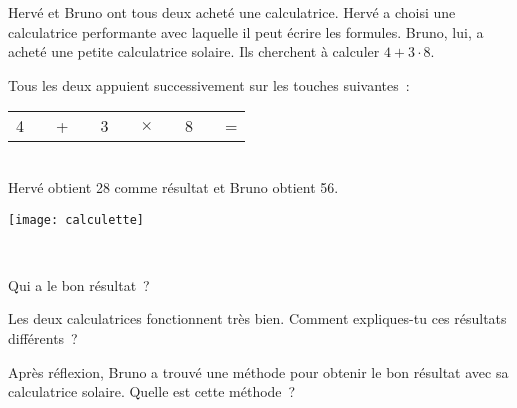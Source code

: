 
\begin{activite}

 \begin{minipage}{0.6\textwidth}
Hervé et Bruno ont tous deux acheté une calculatrice. Hervé a choisi une calculatrice performante avec laquelle il peut écrire les formules. Bruno, lui, a acheté une petite calculatrice solaire. Ils cherchent à calculer $4 + 3 \cdot 8$.

Tous les deux appuient successivement sur les touches suivantes :  \\[0.5em]
\begin{tabular}{|c|c|c|c|c|c|c|c|c|c|c|}
\cline{1-1} \cline{3-3}\cline{5-5} \cline{7-7}\cline{9-9} \cline{11-11}
4 & & + & & 3 & & $\times$ & & 8 & & = \\ \cline{1-1} \cline{3-3}\cline{5-5} \cline{7-7}\cline{9-9} \cline{11-11}
\end{tabular} \\[0.5em]
Hervé obtient 28 comme résultat et Bruno obtient 56.
 \end{minipage} \hfill%
  \begin{minipage}{0.2\textwidth}
   \texttt{[image: calculette]}
   \end{minipage}\\

\begin{partie}
Qui a le bon résultat ?
\end{partie}

\begin{partie}
Les deux calculatrices fonctionnent très bien. Comment expliques-tu ces résultats différents ?
\end{partie}

\begin{partie}
Après réflexion, Bruno a trouvé une méthode pour obtenir le bon résultat avec sa calculatrice solaire. Quelle est cette méthode ?
\end{partie}

\end{activite}


